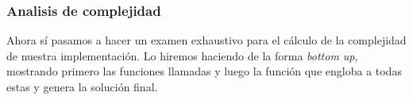 \subsubsection{Analisis de complejidad}

Ahora sí pasamos a hacer un examen exhaustivo para el cálculo de la complejidad de nuestra implementación. Lo hiremos haciendo de la forma \emph{bottom up}, mostrando primero las funciones llamadas y luego la función que engloba a todas estas y genera la solución final.














